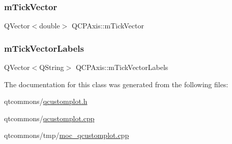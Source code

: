 \subsubsection{\texorpdfstring{mTickVector}{mTickVector}}
{\footnotesize\ttfamily Q\+Vector$<$double$>$ Q\+C\+P\+Axis\+::m\+Tick\+Vector\hspace{0.3cm}{\ttfamily [protected]}}

\mbox{\label{class_q_c_p_axis_aeee4bd0fca3f587eafe33843d1cb4f82}} 
\subsubsection{\texorpdfstring{mTickVectorLabels}{mTickVectorLabels}}
{\footnotesize\ttfamily Q\+Vector$<$Q\+String$>$ Q\+C\+P\+Axis\+::m\+Tick\+Vector\+Labels\hspace{0.3cm}{\ttfamily [protected]}}



The documentation for this class was generated from the following files\+:\begin{DoxyCompactItemize}
\item 
qtcommons/\mbox{\hyperlink{qcustomplot_8h}{qcustomplot.\+h}}\item 
qtcommons/\mbox{\hyperlink{qcustomplot_8cpp}{qcustomplot.\+cpp}}\item 
qtcommons/tmp/\mbox{\hyperlink{moc__qcustomplot_8cpp}{moc\+\_\+qcustomplot.\+cpp}}\end{DoxyCompactItemize}
